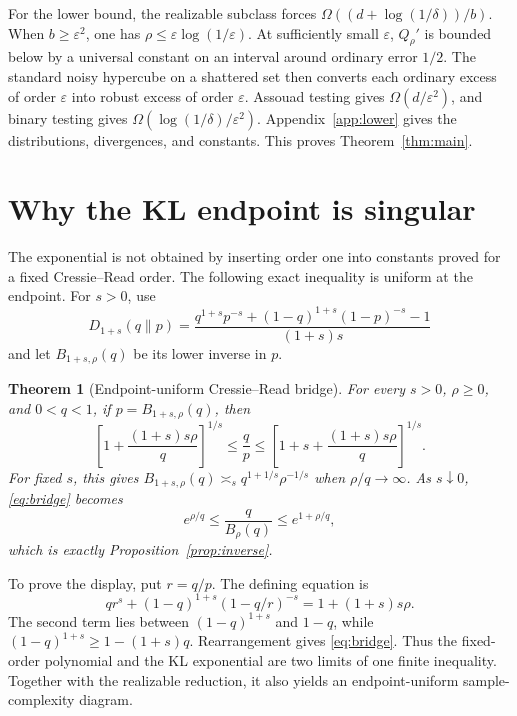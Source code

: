 \documentclass{article}
\newtheorem{theorem}{Theorem}
\theoremstyle{remark}
\newcommand{\eps}{\varepsilon}
\begin{document}
For the lower bound, the realizable subclass forces $\Omega((d+\log(1/\delta))/b)$.  When $b\ge\eps^2$, one has $\rho\le\eps\log(1/\eps)$.  At sufficiently small $\eps$, $Q_\rho'$ is bounded below by a universal constant on an interval around ordinary error $1/2$.  The standard noisy hypercube on a shattered set then converts each ordinary excess of order $\eps$ into robust excess of order $\eps$. Assouad testing gives $\Omega(d/\eps^2)$, and binary testing gives $\Omega(\log(1/\delta)/\eps^2)$.  Appendix~\ref{app:lower} gives the distributions, divergences, and constants.  This proves Theorem~\ref{thm:main}.

\section{Why the KL endpoint is singular}
\label{sec:endpoint}

The exponential is not obtained by inserting order one into constants proved for a fixed Cressie--Read order.  The following exact inequality is uniform at the endpoint.  For $s>0$, use
\begin{equation}
 D_{1+s}(q\|p)=
 \frac{q^{1+s}p^{-s}+(1-q)^{1+s}(1-p)^{-s}-1}{(1+s)s}
 \label{eq:cr}
\end{equation}
and let $B_{1+s,\rho}(q)$ be its lower inverse in $p$.

\begin{theorem}[Endpoint-uniform Cressie--Read bridge]
\label{thm:bridge}
For every $s>0$, $\rho\ge0$, and $0<q<1$, if $p=B_{1+s,\rho}(q)$, then
\begin{equation}
 \left[1+\frac{(1+s)s\rho}{q}\right]^{1/s}
 \le\frac qp\le
 \left[1+s+\frac{(1+s)s\rho}{q}\right]^{1/s}.
 \label{eq:bridge}
\end{equation}
For fixed $s$, this gives $B_{1+s,\rho}(q)\asymp_s q^{1+1/s}\rho^{-1/s}$ when $\rho/q\to\infty$.  As $s\downarrow0$, \eqref{eq:bridge} becomes
\begin{equation}
 e^{\rho/q}\le\frac{q}{B_\rho(q)}\le e^{1+\rho/q},
 \label{eq:bridge-limit}
\end{equation}
which is exactly Proposition~\ref{prop:inverse}.
\end{theorem}

To prove the display, put $r=q/p$.  The defining equation is \[ qr^s+(1-q)^{1+s}(1-q/r)^{-s}=1+(1+s)s\rho. \] The second term lies between $(1-q)^{1+s}$ and $1-q$, while $(1-q)^{1+s}\ge1-(1+s)q$.  Rearrangement gives \eqref{eq:bridge}.  Thus the fixed-order polynomial and the KL exponential are two limits of one finite inequality.  Together with the realizable reduction, it also yields an endpoint-uniform sample-complexity diagram.
\end{document}
